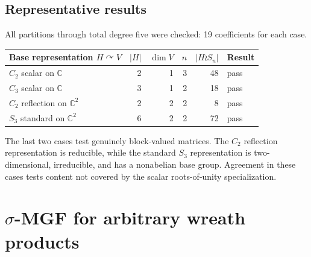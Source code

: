 \documentclass[10pt]{article}
\newcommand{\Sym}{\operatorname{Sym}}
\newcommand{\SMG}{\operatorname{SMG}}
\newcommand{\C}{\mathbb C}
\begin{document}
\subsection{Representative results}

All partitions through total degree five were checked: 19 coefficients for each
case.

\begin{center}
\begin{tabular}{@{}lrrrrl@{}}
\toprule
Base representation $H\curvearrowright V$ & $|H|$ & $\dim V$ & $n$ & $|H\wr S_n|$ & Result\\
\midrule
$C_2$ scalar on $\C$ & 2 & 1 & 3 & 48 & pass\\
$C_3$ scalar on $\C$ & 3 & 1 & 2 & 18 & pass\\
$C_2$ reflection on $\C^2$ & 2 & 2 & 2 & 8 & pass\\
$S_3$ standard on $\C^2$ & 6 & 2 & 2 & 72 & pass\\
\bottomrule
\end{tabular}
\end{center}

The last two cases test genuinely block-valued matrices.  The $C_2$ reflection
representation is reducible, while the standard $S_3$ representation is
two-dimensional, irreducible, and has a nonabelian base group.  Agreement in
these cases tests content not covered by the scalar roots-of-unity specialization.
\endgroup


\clearpage
\section{$\sigma$-MGF for arbitrary wreath products}\label{proof:wreath-general}
\begingroup
{}
\providecommand{\Sym}{\operatorname{Sym}}
\renewcommand{\Sym}{\operatorname{Sym}}
\providecommand{\Exp}{\operatorname{Exp}}
\renewcommand{\Exp}{\operatorname{Exp}}
\providecommand{\cS}{\SMG}
\renewcommand{\cS}{\SMG}
\providecommand{\cW}{\SMG}
\renewcommand{\cW}{\SMG}
\setcounter{theorem}{0}
\setcounter{proposition}{0}
\setcounter{lemma}{0}
\setcounter{corollary}{0}
\setcounter{remark}{0}
\begin{abstract}
For a finite matrix group $\rho:H\to GL(V)$, this note proves the exact
generating function for the block-monomial representation of $H\wr S_n$ on
$V^{\oplus n}$ and its coefficientwise stable limit
$\Exp_\sigma(\cS_H-1)$.  A precise degreewise interpretation explains the
marked compound-Poisson language.  The companion Marimo notebook constructs
all wreath-product matrices and compares their generalized Molien
coefficients with two independent exact recurrences.  Tests for the sign
representation of $C_2$ and the rational two-dimensional representation of
$C_3$ checked 38 finite coefficients, 19 stable coefficients, and every
small cycle-product determinant identity; all passed exactly.
\end{abstract}
\end{document}

